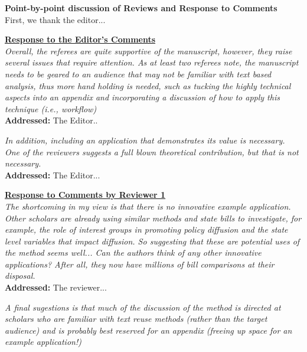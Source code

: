 \documentclass[12pt]{article}
\newcommand{\grey}[1]{{\color{mygrey}#1}}
\begin{document}
\thispagestyle{empty}


\noindent \textbf{Point-by-point discussion of Reviews and Response to Comments}\\

First, we thank the editor...

\bigskip
\bigskip


\noindent \underline{\textbf{Response to the Editor's Comments}}\\

 \grey{\emph{Overall, the referees are quite supportive of the manuscript, however, they raise several issues that require attention. As at least two referees note, the manuscript needs to be geared to an audience that may not be familiar with text based analysis, thus more hand holding is needed, such as tucking the highly technical aspects into an appendix and incorporating a discussion of how to apply this technique (i.e., workflow) }}\\

\noindent \textcolor{MyGreen}{\textbf{Addressed:}} The Editor.. 

 \grey{\emph{In addition, including an application that demonstrates its value is necessary. One of the reviewers suggests a full blown theoretical contribution, but that is not necessary.  }}\\

\noindent \textcolor{MyGreen}{\textbf{Addressed:}} The Editor... 


\noindent \underline{\textbf{Response to Comments by Reviewer 1}}\\

 \grey{\emph{ The shortcoming in my view is that there is no innovative example application. Other scholars are already using similar methods and state bills to investigate, for example, the role of interest groups in promoting policy diffusion and the state level variables that impact diffusion. So suggesting that these are potential uses of the method seems well... Can the authors think of any other innovative applications? After all, they now have millions of bill comparisons at their disposal.}}\\

\noindent \textcolor{MyGreen}{\textbf{Addressed:}} The reviewer... 

 \grey{\emph{  A final sugestions is that much of the discussion of the method is directed at scholars who are familiar with text reuse methods (rather than the target audience) and is probably best reserved for an appendix (freeing up space for an example application!)}}\\
\end{document}
